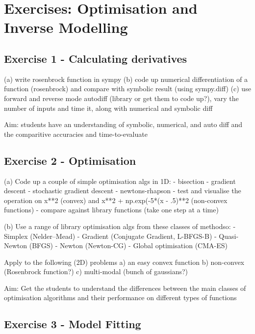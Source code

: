 \documentclass[a4paper]{article}
\begin{document}
\section*{Exercises: Optimisation and Inverse Modelling}

\vspace{0,75cm}


\subsection*{Exercise 1 - Calculating derivatives}

(a) write rosenbrock function in sympy
(b) code up numerical differentiation of a function (rosenbrock) and compare with
symbolic result (using sympy.diff)
(c) use forward and reverse mode autodiff (library or get them to code up?), vary the
number of inputs and time it, along with numerical and symbolic diff

Aim: students have an understanding of symbolic, numerical, and auto diff and the
comparitive accuracies and time-to-evaluate

\subsection*{Exercise 2 - Optimisation}

(a) Code up a couple of simple optimisation algs in 1D:
  - bisection 
  - gradient descent
  - stochastic gradient descent
  - newtons-rhapson
  - test and visualise the operation on x**2 (convex) and x**2 + np.exp(-5*(x - .5)**2
  (non-convex functions)
  - compare against library functions (take one step at a time)

(b) Use a range of library optimisation algs from these classes of methodso:
  - Simplex (Nelder–Mead)
  - Gradient (Conjugate Gradient, L-BFGS-B)
  - Quasi-Newton (BFGS)
  - Newton (Newton-CG)
  - Global optimisation (CMA-ES)

Apply to the following (2D) problems
  a) an easy convex function
  b) non-convex (Rosenbrock function?)
  c) multi-modal (bunch of gaussians?)

Aim: Get the students to understand the differences between the main classes of
optimisation algorithms and their performance on different types of functions


\subsection*{Exercise 3 - Model Fitting}
\end{document}
